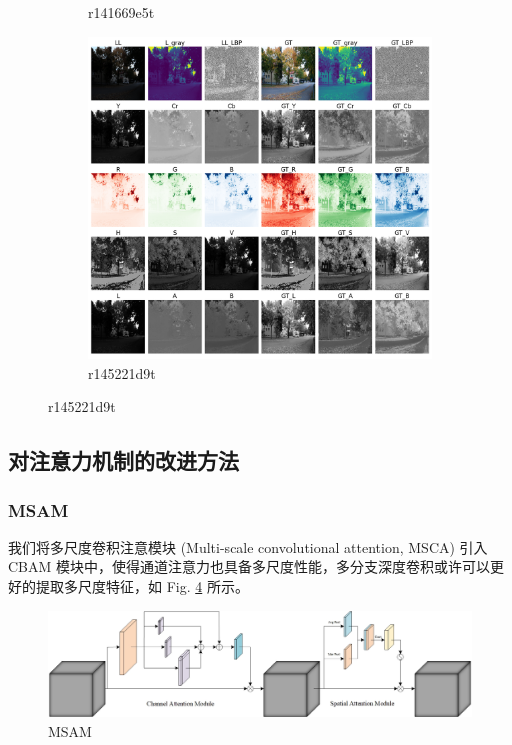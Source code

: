\documentclass[a4paper]{ctexart}
\begin{document}
\begin{figure}[htbp]
\begin{subfigure}{0.3\textwidth}
				\captionsetup{font=scriptsize}
				\caption{r141669e5t}
				\label{fig: myplot_different_color_channels_r141669e5t}	
			\end{subfigure}
			\begin{subfigure}{0.3\textwidth}
				\includegraphics[width=\linewidth]{picture/LLIE/Experiment/myplot_different_color_channels_r145221d9t}
				\captionsetup{font=scriptsize}
				\caption{r145221d9t}
				\label{fig: myplot_different_color_channels_r145221d9t}	
			\end{subfigure}
		\end{figure}
		
		\FloatBarrier
		
		\subsection*{对注意力机制的改进方法}
		
		\subsubsection*{MSAM}
		
		我们将多尺度卷积注意模块 (Multi-scale convolutional attention, MSCA) 引入 CBAM 模块中，使得通道注意力也具备多尺度性能，多分支深度卷积或许可以更好的提取多尺度特征，如 Fig. \ref{fig: MSAM} 所示。
		
		\begin{figure}[htbp]
			\centering
			\includegraphics[width=0.8\linewidth]{picture/LLIE/Experiment/Attention/MSAM}
			\caption{MSAM}
			\label{fig: MSAM}
		\end{figure}
		
\end{document}
